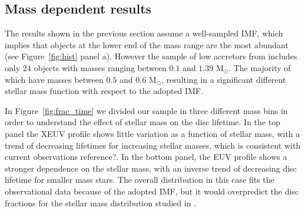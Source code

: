 \documentclass[fleqn,usenatbib,letters]{mnras}
\begin{document}



\subsection{Mass dependent results}

The results shown in the previous section assume a well-sampled IMF, which implies that objects at the lower end of the mass range are the most abundant (see Figure~\ref{fig:hist} panel a). However the sample of low accretors from \citet{Thanathibodee2023} includes only $24$ objects with masses ranging between $0.1$ and $1.39$ M$_\odot$. The majority of which have masses between $0.5$ and $0.6$ M$_\odot$, resulting in a significant different stellar mass function with respect to the adopted IMF.

In Figure~\ref{fig:frac_time} we divided our sample in three different mass bins in order to understand the effect of stellar mass on the disc lifetime. In the top panel the XEUV profile shows little variation as a function of stellar mass, with a trend of decreasing lifetimes for increasing stellar masses, which is consistent with current observations {\color{red} reference?}. In the bottom panel, the EUV profile shows a stronger dependence on the stellar mass, with an inverse trend of decreasing disc lifetime for smaller mass stars. The overall distribution in this case fits the observational data because of the adopted IMF, but it would overpredict the disc fractions for the stellar mass distribution studied in \citet{Thanathibodee2023}.
\end{document}
